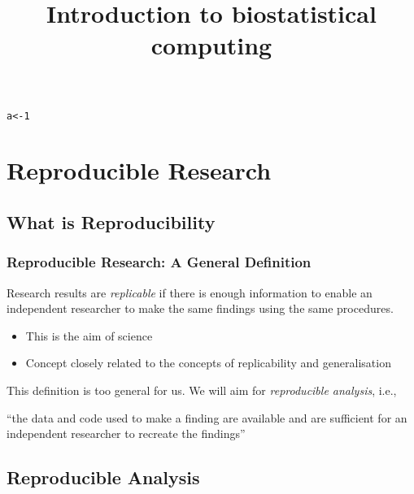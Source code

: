 \documentclass[paper=screen,mathserif]{beamer}\usepackage[]{graphicx}\usepackage[]{color}
\title{Introduction to biostatistical computing}
\institute[]{\scriptsize{\url{arthur.allignol@uni-ulm.de}}}
\date{}
\makeatletter
\newcommand{\hlnum}[1]{\textcolor[rgb]{0.686,0.059,0.569}{#1}}%
\newcommand{\hlstd}[1]{\textcolor[rgb]{0.345,0.345,0.345}{#1}}%
\newcommand{\hlkwb}[1]{\textcolor[rgb]{0.69,0.353,0.396}{#1}}%
\newenvironment{kframe}{%
 \def\at@end@of@kframe{}%
 \ifinner\ifhmode%
  \def\at@end@of@kframe{\end{minipage}}%
  \begin{minipage}{\columnwidth}%
 \fi\fi%
 \def\FrameCommand##1{\hskip\@totalleftmargin \hskip-\fboxsep
 \colorbox{shadecolor}{##1}\hskip-\fboxsep
     \hskip-\linewidth \hskip-\@totalleftmargin \hskip\columnwidth}%
 \MakeFramed {\advance\hsize-\width
   \@totalleftmargin\z@ \linewidth\hsize
   \@setminipage}}%
 {\par\unskip\endMakeFramed%
 \at@end@of@kframe}
\makeatother
\begin{document}

\newcommand{\titlep}{yes}  %

{
\renewcommand{\insertframenumber}{}   %
\begin{frame}
\addtocounter{framenumber}{-1}
\titlepage
\end{frame}
}



\begin{kframe}
\begin{alltt}
\hlstd{a} \hlkwb{<-} \hlnum{1}
\end{alltt}
\end{kframe}


\frame{\tableofcontents[currentsection]}

\section{Reproducible Research}

\subsection{What is Reproducibility}

\begin{frame}
  \frametitle{Reproducible Research: A General Definition}
  Research results are {\em replicable} if there is enough information
  to enable an independent researcher to make the same findings using
  the same procedures.
  \begin{itemize}
  \item This is the aim of science
  \item Concept closely related to the concepts of replicability and
    generalisation
  \end{itemize}
  This definition is too general for us. We will aim for {\em
    reproducible analysis}, i.e., 
  
  \begin{center}
    ``the data and code used to make a
    finding are available and are sufficient for an independent
    researcher to recreate the findings''
  \end{center}
\end{frame}

\subsection{Reproducible Analysis}
\end{document}
